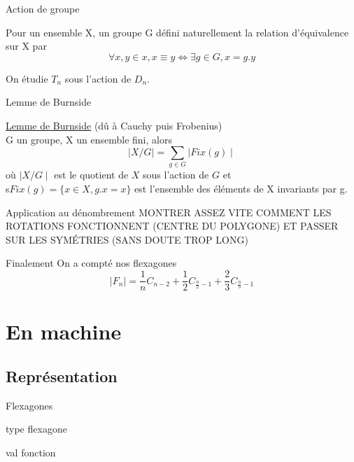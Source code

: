 \documentclass[french,xcolor=dvipsnames]{beamer}
\begin{document}
		\begin{frame}{Action de groupe}
			\begin{definition}
			Pour un ensemble X, un groupe G défini naturellement la relation d'équivalence sur X par
			\[
				\forall x,y \in x, x \equiv y \Leftrightarrow \exists g \in G, x=g.y
			\]
			\end{definition}
			
			On étudie $T_{n}$ sous l'action de $D_{n}$.
		\end{frame}
		\begin{frame}{Lemme de Burnside}
			\begin{theorem}{\underline{Lemme de Burnside} \small{(dû à Cauchy puis Frobenius)}\\}
				G un groupe, X un ensemble fini, alors
				\[
				\mid X/G \mid = \sum_{g\in G}{\mid Fix(g) \mid}
				\]
				où $\mid X/G \mid$ est le quotient de $X$ sous l'action de $G$ et \\s$Fix(g) = \{x\in X, g.x = x\}$ est l'ensemble des éléments de X invariants par g.
			\end{theorem}
		\end{frame}
		
		\begin{frame}{Application au dénombrement}
			MONTRER ASSEZ VITE COMMENT LES ROTATIONS FONCTIONNENT (CENTRE DU POLYGONE) ET PASSER SUR LES SYMÉTRIES (SANS DOUTE TROP LONG)
		\end{frame}
		
		\begin{frame}{Finalement}
		On a compté nos flexagones
		{\Large
		\[
			\mid F_{n} \mid = \frac{1}{n}C_{n-2} + \frac{1}{2}C_{\frac{n}{2}-1} + \frac{2}{3}C_{\frac{n}{3}-1}
		\]
		}
		\end{frame}		
		
		
	\section{En machine}
		\subsection{Représentation}
		
		\begin{frame}{Flexagones}
			\begin{list}{Définition d'un type abtrait}
			\item type flexagone
			\item val fonction
			\end{list}

		\end{frame}
\end{document}

